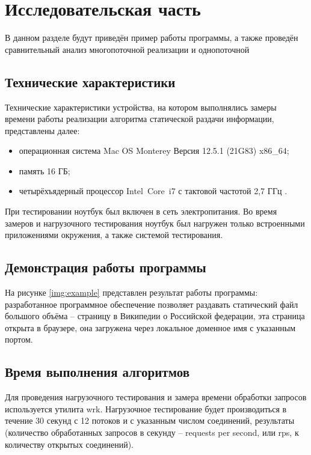 \chapter{Исследовательская часть}

В данном разделе будут приведён пример работы программы, а также проведён сравнительный анализ многопоточной реализации и однопоточной

\section{Технические характеристики}

Технические характеристики устройства, на котором выполнялись замеры времени работы реализации алгоритма статической раздачи информации, представлены далее:

\begin{itemize}[label=---]
	\item операционная система Mac OS Monterey Версия 12.5.1 (21G83) \cite{macos} x86\_64;
	\item память 16 ГБ;
	\item четырёхъядерный процессор Intel Core i7 с тактовой частотой 2,7 ГГц \cite{intel}.
\end{itemize}

При тестировании ноутбук был включен в сеть электропитания. Во время замеров и нагрузочного тестирования ноутбук был нагружен только встроенными приложениями окружения, а также системой тестирования.

\section{Демонстрация работы программы}

На рисунке \ref{img:example} представлен результат работы программы: разработанное программное обеспечение позволяет раздавать статический файл большого объёма -- страницу в Википедии о Российской федерации, эта страница открыта в браузере, она загружена через локальное доменное имя с указанным портом.

\clearpage

\section{Время выполнения алгоритмов}

Для проведения нагрузочного тестирования и замера времени обработки запросов используется утилита wrk.
Нагрузочное тестирование будет производиться в течение 30 секунд с 12 потоков и с указанным числом соединений, результаты (количество обработанных запросов в секунду -- requests per second, или rps, к количеству открытых соединений).

